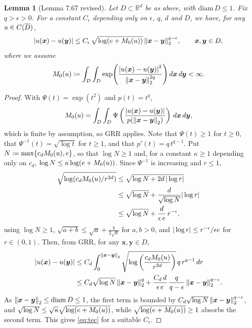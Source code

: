 \documentclass[final]{article}
\newtheorem*{lemma*}{Lemma}
\theoremstyle{definition}
\newcommand{\vecbs}[1]{\boldsymbol{#1}}
\renewcommand{\vec}[1]{{\vecbs{#1}}}
\begin{document}
\begin{enumerate}
\begin{description}
\begin{lemma*}[Lemma 7.67 revised]%
  \label{lemma:technical}%
  Let $D\subset\mathbb{R}^d$ be as above, with $\mathrm{diam}\,D\le1$.  Fix
  $q>\epsilon>0$. For a constant $C_\epsilon$ depending only on $\epsilon$,
  $q$, $d$ and $D$, we have, for any $u\in {C}({\overline{D}})$,
  \begin{equation}\label{eq:tec}
    |u(\vec x)-u(\vec y)|%
    \le C_\epsilon\,\sqrt{\log\pp{\erm+ M_0(u)}}\,
    \enorm{ \vec x- \vec y}^{q-\epsilon},\qquad  \vec x, \vec y\in D,%
  \end{equation}
  where we assume
  \begin{equation}
    \label{eq:star}
M_0(u)\coloneq    \int_D \int_D%
    \exp \pp{\frac{\abs{u(\vec x)-u(\vec y)}^2}{
      \enorm{\vec x-\vec y}^{2q}}}\,d \vec x \,d \vec y
     <\infty.
  \end{equation}
 \end{lemma*}
%
\begin{proof} With $\Psi(t)=\exp(t^2)$ and $p(t)=t^q$,
  $$
  M_0(u)=
  \int_D \int_D \Psi\left(\frac{|u(\vec x)-u(\vec y)|}{p(\enorm{\vec x-\vec y})}\right)\,d\vec x\,d\vec y,
  $$
  which is finite by assumption, so GRR applies.  Note that $\Psi(t)\ge 1$ for
  $t\ge 0$, that $\Psi^{-1}(t)=\sqrt{\log t}$ for $t\ge 1$, and that
  $p'(t)=q\, t^{q-1}$.  Put $N\coloneq \max\Bp{c_dM_0(u),\erm}$, so that $\log
  N\ge 1$ and, for a constant $\kappa\ge1$ depending only on $c_d$, $\log N\le
  \kappa \log\pp{\erm+M_0(u)}$.  Since $\Psi^{-1}$ is increasing and
  $r\le 1$,
   \begin{align*}
  \sqrt{\log (c_dM_0(u) /r^{2d})}
  &\le\sqrt{\log N+ 2d\, |\log r|}\\
  &\le
  \sqrt{\log N}
  +\frac{d}{ \sqrt{\log N}} |\log r|\\
  &\le
  \sqrt{\log N} + \frac{d}{\epsilon\,{e}}\, r^{-\epsilon},
\end{align*}
  using $\log N\ge1$, $\sqrt{a+b}\le \sqrt{a} +\frac{b}{2\sqrt{a}}$ for $a,b>0$,
  and $|\log r|\le r^{-\epsilon}/\epsilon{e}$ for $r\in(0,1)$.
   Then, from GRR, for any $\vec x,\vec y\in D$,
  \begin{align*}
  |u(\vec x)-u(\vec y)|
  &\le C_d\int_0^{\enorm{\vec x-\vec y}}
  \sqrt{\log\left(\frac{c_dM_0(u)}{r^{2d}}\right)}
  \,q\,r^{q-1}\,dr
  \\
  &\le C_d\sqrt{\log N}\, \enorm{\vec x-\vec y}^{q}
  + \frac{C_d\,d}{\epsilon\,\erm}\, \frac{q}{q-\epsilon}\,\enorm{\vec x-\vec y}^{q-\epsilon}.
  \end{align*}
  As $\enorm{\vec x-\vec y}\le \mathrm{diam}\,D\le1$, the first term is bounded
  by $C_d\sqrt{\log N}\,\enorm{\vec x-\vec y}^{q-\epsilon}$, and
  $\sqrt{\log N}\le \sqrt{\kappa}\sqrt{\log\pp{\erm+M_0(u)}}$, while
  $\sqrt{\log\pp{\erm+M_0(u)}}\ge1$ absorbs the second term. This gives
  \eqref{eq:tec} for a suitable $C_\epsilon$.
\end{proof}
%




\end{description}
\end{enumerate}
\end{document}
